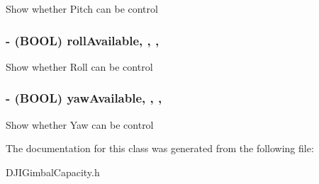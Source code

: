 Show whether Pitch can be control \hypertarget{interface_d_j_i_gimbal_capacity_a6cd2e6ea9363c2ac0c7de4b067c68fc4}{
\subsubsection[{roll\+Available}]{\setlength{\rightskip}{0pt plus 5cm}-\/ (B\+O\+O\+L) roll\+Available\hspace{0.3cm}{\ttfamily [read]}, {\ttfamily [write]}, {\ttfamily [nonatomic]}, {\ttfamily [assign]}}}\label{interface_d_j_i_gimbal_capacity_a6cd2e6ea9363c2ac0c7de4b067c68fc4}
Show whether Roll can be control \hypertarget{interface_d_j_i_gimbal_capacity_ae1d242caa56f79093279e681fafdf6f9}{
\subsubsection[{yaw\+Available}]{\setlength{\rightskip}{0pt plus 5cm}-\/ (B\+O\+O\+L) yaw\+Available\hspace{0.3cm}{\ttfamily [read]}, {\ttfamily [write]}, {\ttfamily [nonatomic]}, {\ttfamily [assign]}}}\label{interface_d_j_i_gimbal_capacity_ae1d242caa56f79093279e681fafdf6f9}
Show whether Yaw can be control 

The documentation for this class was generated from the following file\+:\begin{DoxyCompactItemize}
\item 
D\+J\+I\+Gimbal\+Capacity.\+h\end{DoxyCompactItemize}
